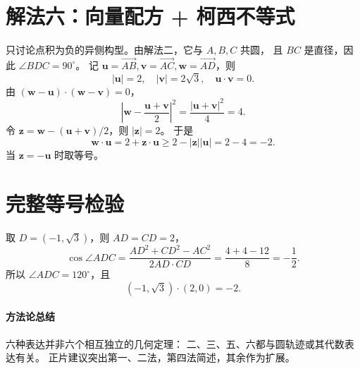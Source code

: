 \documentclass[UTF8,11pt,a4paper]{ctexart}
\newcommand{\V}[1]{\overrightarrow{#1}}
\begin{document}
\section{解法六：向量配方 + 柯西不等式}
只讨论点积为负的异侧构型。由解法二，它与 $A,B,C$ 共圆，
且 $BC$ 是直径，因此 $\angle BDC=90^\circ$。
记 $\mathbf u=\V{AB},\mathbf v=\V{AC},\mathbf w=\V{AD}$，则
\[
|\mathbf u|=2,\quad |\mathbf v|=2\sqrt3,\quad
\mathbf u\cdot\mathbf v=0.
\]
由 $(\mathbf w-\mathbf u)\cdot(\mathbf w-\mathbf v)=0$，
\[
\left|\mathbf w-\frac{\mathbf u+\mathbf v}{2}\right|^2
=\frac{|\mathbf u+\mathbf v|^2}{4}=4.
\]
令 $\mathbf z=\mathbf w-(\mathbf u+\mathbf v)/2$，则 $|\mathbf z|=2$。
于是
\[
\mathbf w\cdot\mathbf u
=2+\mathbf z\cdot\mathbf u
\ge 2-|\mathbf z||\mathbf u|
=2-4=-2.
\]
当 $\mathbf z=-\mathbf u$ 时取等号。

\section*{完整等号检验}
取 $D=(-1,\sqrt3)$，则 $AD=CD=2$，
\[
\cos\angle ADC=
\frac{AD^2+CD^2-AC^2}{2AD\cdot CD}
=\frac{4+4-12}{8}=-\frac12.
\]
所以 $\angle ADC=120^\circ$，且
\[
(-1,\sqrt3)\cdot(2,0)=\boxed{-2}.
\]
\paragraph{方法论总结}
六种表达并非六个相互独立的几何定理：
二、三、五、六都与圆轨迹或其代数表达有关。
正片建议突出第一、二法，第四法简述，其余作为扩展。
\end{document}
